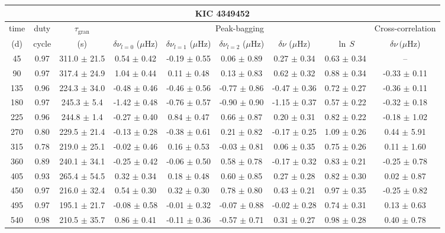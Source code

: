 \documentclass[twocolumn]{aastex61}%
\begin{document}
\begin{table*}[ht]\centering\fontsize{9.}{7.}\selectfont
\begin{tabular}{ccc|ccccc|c}
\multicolumn{9}{c}{KIC 4349452}\\ \hline\hline
time & duty & $\tau_\text{gran}$ &\multicolumn{5}{c|}{Peak-bagging}&Cross-correlation\\
(d)& cycle & (s)&$\delta\nu_{l=0}$ ($\mu$Hz) & $\delta\nu_{l=1}$ ($\mu$Hz) & $\delta\nu_{l=2}$ ($\mu$Hz) & $\delta\nu$ ($\mu$Hz)& $\ln\,S$ & $\delta\nu\,(\mu$Hz)\\\hline
45 & 0.97 & 311.0 $\pm$ 21.5 & 0.54 $\pm$ 0.42 & -0.19 $\pm$ 0.55 & 0.06 $\pm$ 0.89 & 0.27 $\pm$ 0.34 & 0.63 $\pm$ 0.34 & --\\
90 & 0.97 & 317.4 $\pm$ 24.9 & 1.04 $\pm$ 0.44 & 0.11 $\pm$ 0.48 & 0.13 $\pm$ 0.83 & 0.62 $\pm$ 0.32 & 0.88 $\pm$ 0.34 & -0.33 $\pm$ 0.11\\
135 & 0.96 & 224.3 $\pm$ 34.0 & -0.48 $\pm$ 0.46 & -0.46 $\pm$ 0.56 & -0.77 $\pm$ 0.86 & -0.47 $\pm$ 0.36 & 0.72 $\pm$ 0.27 & -0.36 $\pm$ 0.11\\
180 & 0.97 & 245.3 $\pm$ 5.4 & -1.42 $\pm$ 0.48 & -0.76 $\pm$ 0.57 & -0.90 $\pm$ 0.90 & -1.15 $\pm$ 0.37 & 0.57 $\pm$ 0.22 & -0.32 $\pm$ 0.18\\
225 & 0.96 & 244.8 $\pm$ 1.4 & -0.27 $\pm$ 0.40 & 0.84 $\pm$ 0.47 & 0.66 $\pm$ 0.87 & 0.20 $\pm$ 0.31 & 0.82 $\pm$ 0.22 & -0.18 $\pm$ 1.02\\
270 & 0.80 & 229.5 $\pm$ 21.4 & -0.13 $\pm$ 0.28 & -0.38 $\pm$ 0.61 & 0.21 $\pm$ 0.82 & -0.17 $\pm$ 0.25 & 1.09 $\pm$ 0.26 & 0.44 $\pm$ 5.91\\
315 & 0.78 & 219.0 $\pm$ 25.1 & -0.02 $\pm$ 0.46 & 0.16 $\pm$ 0.53 & -0.03 $\pm$ 0.81 & 0.06 $\pm$ 0.35 & 0.75 $\pm$ 0.26 & 0.11 $\pm$ 1.60\\
360 & 0.89 & 240.1 $\pm$ 34.1 & -0.25 $\pm$ 0.42 & -0.06 $\pm$ 0.50 & 0.58 $\pm$ 0.78 & -0.17 $\pm$ 0.32 & 0.83 $\pm$ 0.21 & -0.25 $\pm$ 0.78\\
405 & 0.93 & 265.4 $\pm$ 54.5 & 0.32 $\pm$ 0.34 & 0.18 $\pm$ 0.48 & 0.60 $\pm$ 0.85 & 0.27 $\pm$ 0.28 & 0.82 $\pm$ 0.30 & 0.02 $\pm$ 0.87\\
450 & 0.97 & 216.0 $\pm$ 32.4 & 0.54 $\pm$ 0.30 & 0.32 $\pm$ 0.30 & 0.78 $\pm$ 0.80 & 0.43 $\pm$ 0.21 & 0.97 $\pm$ 0.35 & -0.25 $\pm$ 0.82\\
495 & 0.97 & 195.1 $\pm$ 21.7 & -0.08 $\pm$ 0.58 & -0.01 $\pm$ 0.32 & -0.07 $\pm$ 0.88 & -0.02 $\pm$ 0.28 & 0.74 $\pm$ 0.31 & 0.13 $\pm$ 0.63\\
540 & 0.98 & 210.5 $\pm$ 35.7 & 0.86 $\pm$ 0.41 & -0.11 $\pm$ 0.36 & -0.57 $\pm$ 0.71 & 0.31 $\pm$ 0.27 & 0.98 $\pm$ 0.28 & 0.40 $\pm$ 0.78\\

\end{tabular}
\end{table*}
\end{document}
